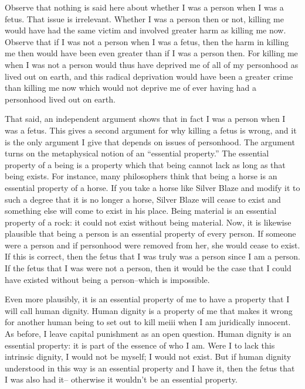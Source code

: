 Observe that nothing is said here about whether I was a person when 
I was a fetus.  That issue is irrelevant.  Whether I was a person then or 
not,  killing  me  would  have  had  the  same  victim  and  involved  greater 
harm as killing me now.  Observe that if I was not a person when I was a 
fetus, then the harm in killing me then would have been even greater than 
if I was a person then.  For killing me when I was not a person would 
thus have deprived me of all of my personhood as lived out on earth, and 
this radical deprivation would have been a greater crime than killing me 
now which would not deprive me of ever having had a personhood lived 
out on earth. 

That  said,  an  independent  argument  shows  that  in  fact  I  was  a 
person when I was a fetus.  This gives a second argument for why killing 
a fetus is wrong, and it is the only argument I give that depends on issues 
of  personhood.    The argument turns on the metaphysical notion of an 
“essential  property.”    The  essential  property  of  a  being  is  a  property 
which that being cannot lack as long as that being exists.  For instance, 
many philosophers think that being a horse is an essential property of a 
horse.    If  you  take  a  horse  like  Silver  Blaze  and  modify  it  to  such  a 
degree that it is no longer a horse, Silver Blaze will cease to exist and 
something  else  will  come  to  exist  in  his  place.    Being  material  is  an 
essential property of a rock: it could not exist without being material. 
Now,  it  is  likewise  plausible  that  being  a  person  is  an  essential 
property of every person.  If someone were a person and if personhood 
were removed from her, she would cease to exist.  If this is correct, then 
the fetus that I was truly was a person since I am a person.  If the fetus 
that I was were not a person, then it would be the case that I could have 
existed without being a person–which is impossible. 

Even  more  plausibly,  it  is  an  essential  property  of  me  to  have  a 
property that I will call human dignity.  Human dignity is a property of
me that makes it wrong for another human being to set out to kill meiii 
when I am juridically innocent.  As before, I leave capital punishment as 
an open question.  Human dignity is an essential property: it is part of the 
essence of who I am. Were I to lack this intrinsic dignity, I would not be 
myself; I would not exist.  But if human dignity understood in this way is 
an essential property and I have it, then the fetus that I was also had it–
otherwise it wouldn’t be an essential property. 

